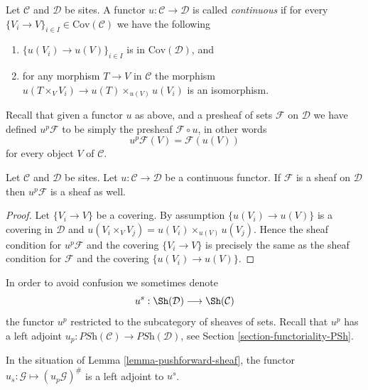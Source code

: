 \begin{definition}
\label{definition-continuous}
Let $\mathcal{C}$ and $\mathcal{D}$ be sites.
A functor $u : \mathcal{C} \to \mathcal{D}$ is called
{\it continuous} if for every
$\{V_i \to V\}_{i\in I} \in \text{Cov}(\mathcal{C})$
we have the following
\begin{enumerate}
\item $\{u(V_i) \to u(V)\}_{i\in I}$ is in $\text{Cov}(\mathcal{D})$, and
\item for any morphism $T \to V$ in $\mathcal{C}$ the morphism
$u(T \times_V V_i) \to u(T) \times_{u(V)} u(V_i)$ is an isomorphism.
\end{enumerate}
\end{definition}

\noindent
Recall that given a functor $u$ as above, and a presheaf of sets
$\mathcal{F}$ on $\mathcal{D}$ we have defined
$u^p\mathcal{F}$ to be simply the presheaf
$\mathcal{F} \circ u$, in other words
$$
u^p\mathcal{F} (V) = \mathcal{F}(u(V))
$$
for every object $V$ of $\mathcal{C}$.

\begin{lemma}
\label{lemma-pushforward-sheaf}
Let $\mathcal{C}$ and $\mathcal{D}$ be sites.
Let $u : \mathcal{C} \to \mathcal{D}$ be a continuous functor.
If $\mathcal{F}$ is a sheaf on $\mathcal{D}$ then
$u^p\mathcal{F}$ is a sheaf as well.
\end{lemma}

\begin{proof}
Let $\{V_i \to V\}$ be a covering.
By assumption $\{u(V_i) \to u(V)\}$ is a covering
in $\mathcal{D}$ and $u(V_i \times_V V_j) =
u(V_i)\times_{u(V)}u(V_j)$. Hence the sheaf condition for
$u^p\mathcal{F}$ and the covering $\{V_i \to V\}$
is precisely the same as the sheaf condition for $\mathcal{F}$
and the covering $\{u(V_i) \to u(V)\}$.
\end{proof}

\noindent
In order to avoid confusion we sometimes denote
$$
u^s :
\Sh(\mathcal{D})
\longrightarrow
\Sh(\mathcal{C})
$$
the functor $u^p$ restricted to the subcategory of sheaves of sets.
Recall that $u^p$ has a left adjoint
$u_p : \textit{PSh}(\mathcal{C}) \to \textit{PSh}(\mathcal{D})$, see
Section \ref{section-functoriality-PSh}.

\begin{lemma}
\label{lemma-adjoint-sheaves}
In the situation of Lemma \ref{lemma-pushforward-sheaf}, the functor $u_s : \mathcal{G} \mapsto (u_p \mathcal{G})^\#$
is a left adjoint to $u^s$.
\end{lemma}


